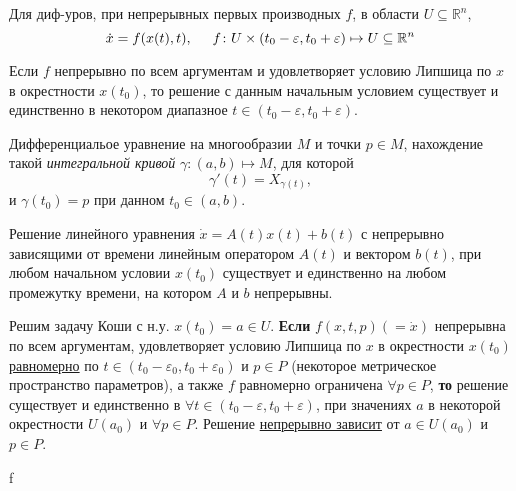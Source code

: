 Для диф-уров, при непрерывных первых производных $f$, в области $U \subseteq \mathbb{R}^n$, 
\begin{equation*}
    \dot{x} = f(x(t), t), \hspace{0.5cm}  
    f \colon U \times (t_0 - \varepsilon, t_0 + \varepsilon) \mapsto U \subseteq \mathbb{R}^n
\end{equation*}
\begin{to_thr}
     Если $f$ непрерывно по всем аргументам и удовлетворяет условию Липшица по $x$ в окрестности $x(t_0)$, то решение с данным начальным условием существует и единственно в некотором диапазное $t \in (t_0 - \varepsilon, t_0 + \varepsilon)$.
\end{to_thr}

\begin{to_def} 
    Дифференциальое уравнение на многообразии $M$ и точки $p \in M$, нахождение такой \textit{интегральной кривой} $\gamma \colon (a, b) \mapsto M$, для которой
    \begin{equation*}
        \gamma'(t) = X_{\gamma(t)},
    \end{equation*}
    и $\gamma(t_0) = p$ при данном $t_0 \in (a, b)$.
\end{to_def}


\begin{to_thr}
     Решение линейного уравнения $\dot{x} = A(t) x(t) + b(t)$ с непрерывно зависящими от времени линейным оператором $A(t)$ и вектором $b(t)$, при любом начальном условии $x(t_0)$ существует и единственно на любом промежутку времени, на котором $A$ и $b$ непрерывны.
\end{to_thr}


\begin{to_thr} 
    Решим задачу Коши с н.у. $x(t_0)=a \in U$.
    \textbf{Если} $f(x, t, p) (= \dot{x})$ непрерывна по всем аргументам, удовлетворяет условию Липшица по $x$ в окрестности $x(t_0)$ 
    \underline{равномерно} по $t \in (t_0 - \varepsilon_0, t_0 + \varepsilon_0)$ и $p \in P$ (некоторое метрическое пространство параметров), а также $f$ равномерно ограничена $\forall p \in P$, \textbf{то} решение существует и единственно в $\forall t \in (t_0 - \varepsilon, t_0 + \varepsilon)$, при значениях $a$ в некоторой окрестности $U(a_0)$ и $\forall p \in P$. Решение \underline{непрерывно зависит} от $a \in U(a_0)$ и $p \in P$.
\end{to_thr}


f


